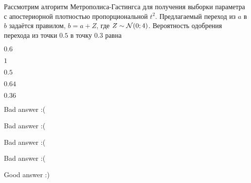 
\begin{question}
Рассмотрим алгоритм Метрополиса-Гастингса для получения выборки
параметра с апостериорной плотностью пропорциональной \(t^2\).
Предлагаемый переход из \(a\) в \(b\) задаётся правилом, \(b = a + Z\),
где \(Z \sim \mathcal{N}(0;4)\). Вероятность одобрения перехода из точки \(0.5\)
в точку \(0.3\) равна
\begin{answerlist}
  \item \(0.6\)
  \item \(1\)
  \item \(0.5\)
  \item \(0.64\)
  \item \(0.36\)
\end{answerlist}
\end{question}

\begin{solution}
\begin{answerlist}
  \item Bad answer :(
  \item Bad answer :(
  \item Bad answer :(
  \item Bad answer :(
  \item Good answer :)
\end{answerlist}
\end{solution}

